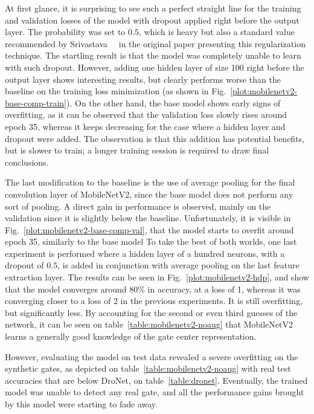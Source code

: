 

At first glance, it is surprising to see such a perfect straight line for the
training and validation losses of the model with dropout applied right before
the output layer. The probability was set to $0.5$, which is heavy but also a
standard value recommended by Srivastava~\etal~\cite{Dropout} in the original
paper presenting this regularization technique. The startling result is that
the model was completely unable to learn with such dropout. However, adding one
hidden layer of size 100 right before the output layer shows interesting
results, but clearly performs worse than the baseline on the training loss
minimization (as shown in Fig.~\ref{plot:mobilenetv2-base-comp-train}).  On
the other hand, the base model shows early signs of overfitting, as it can be
observed that the validation loss slowly rises around epoch 35, whereas it
keeps decreasing for the case where a hidden layer and dropout were added. The
observation is that this addition has potential benefits, but is slower to
train; a longer training session is required to draw final conclusions.

The last modification to the baseline is the use of average pooling for the
final convolution layer of MobileNetV2, since the base model does not perform
any sort of pooling. A direct gain in performance is observed, mainly on the
validation since it is slightly below the baseline. Unfortunately, it is
visible in Fig.~\ref{plot:mobilenetv2-base-comp-val}, that the model starts
to overfit around epoch 35, similarly to the base model 
To take the best of both worlds, one last experiment is performed where a
hidden layer of a hundred neurons, with a dropout of $0.5$, is added in
conjunction with average pooling on the last feature extraction layer. The
results can be seen in Fig.~\ref{plot:mobilenetv2-hdp}, and show that the
model converges around 80\% in accuracy, at a loss of 1, whereas it was
converging closer to a loss of 2 in the previous experiments. It is still
overfitting, but significantly less. By accounting for the second or even third
guesses of the network, it can be seen on table~\ref{table:mobilenetv2-noaug}
that MobileNetV2 learns a generally good knowledge of the gate center
representation.



However, evaluating the model on test data revealed a severe overfitting on the
synthetic gates, as depicted on table~\ref{table:mobilenetv2-noaug} with real
test accuracies that are below DroNet, on table~\ref{table:dronet}. Eventually,
the trained model was unable to detect any real gate, and all the performance
gains brought by this model were starting to fade away.

